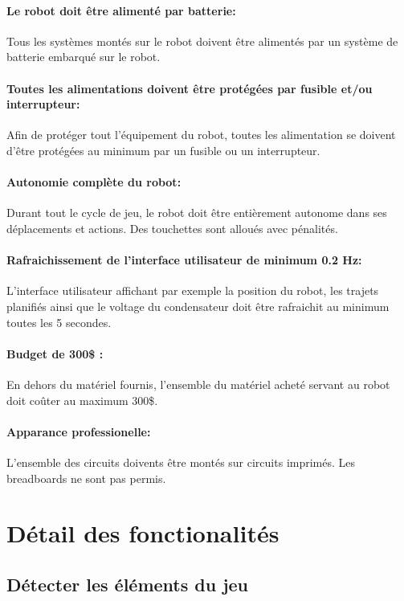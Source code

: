 \paragraph{Le robot doit être alimenté par batterie:}
Tous les systèmes montés sur le robot doivent être alimentés par un système de batterie embarqué sur le robot.

\paragraph{Toutes les alimentations doivent être protégées par fusible et/ou interrupteur:}
Afin de protéger tout l'équipement du robot, toutes les alimentation se doivent d'être protégées au minimum par un fusible ou un interrupteur.

\paragraph{Autonomie complète du robot:}
Durant tout le cycle de jeu, le robot doit être entièrement autonome dans ses déplacements et actions. Des touchettes sont alloués avec pénalités.

\paragraph{Rafraichissement de l'interface utilisateur de minimum 0.2 Hz:}
L'interface utilisateur affichant par exemple la position du robot, les trajets planifiés ainsi que le voltage du condensateur doit être rafraichit au minimum toutes les 5 secondes.

\paragraph{Budget de 300\$ :}
En dehors du matériel fournis, l'ensemble du matériel acheté servant au robot doit coûter au maximum 300\$.

\paragraph{Apparance professionelle:}
L'ensemble des circuits doivents être montés sur circuits imprimés. Les breadboards ne sont pas permis.

\section{Détail des fonctionalités}

\subsection{Détecter les éléments du jeu}

